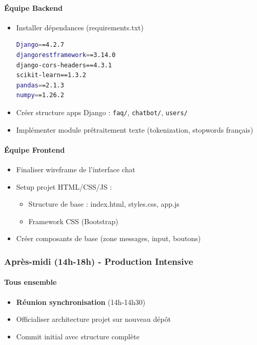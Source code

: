 \documentclass[11pt,a4paper]{article}
\begin{document}
\paragraph{Équipe Backend}
\begin{itemize}
    \item[$\square$] Installer dépendances (requirements.txt)
    \begin{lstlisting}[language=bash]
Django==4.2.7
djangorestframework==3.14.0
django-cors-headers==4.3.1
scikit-learn==1.3.2
pandas==2.1.3
numpy==1.26.2
    \end{lstlisting}
    \item[$\square$] Créer structure apps Django : \texttt{faq/}, \texttt{chatbot/}, \texttt{users/}
    \item[$\square$] Implémenter module prétraitement texte (tokenization, stopwords français)
\end{itemize}

\paragraph{Équipe Frontend}
\begin{itemize}
    \item[$\square$] Finaliser wireframe de l'interface chat
    \item[$\square$] Setup projet HTML/CSS/JS :
    \begin{itemize}
        \item Structure de base : index.html, styles.css, app.js
        \item Framework CSS (Bootstrap)
    \end{itemize}
    \item[$\square$] Créer composants de base (zone messages, input, boutons)
\end{itemize}

\subsubsection{Après-midi (14h-18h) - Production Intensive}

\paragraph{Tous ensemble}
\begin{itemize}
    \item[$\square$] \textbf{Réunion synchronisation} (14h-14h30)
    \item[$\square$] Officialiser architecture projet sur nouveau dépôt
    \item[$\square$] Commit initial avec structure complète
\end{itemize}
\end{document}
